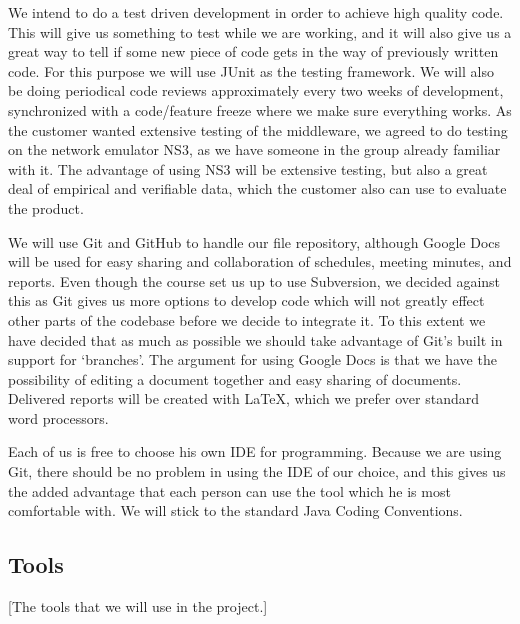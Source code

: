\documentclass[12pt]{article}
\begin{document}
    We  intend to do a test driven development in order to achieve high quality code. This will give us something to test while we are working, and it will also give us a great way to tell if some new piece of code gets in the way of previously written code. For this purpose we will use JUnit as the testing framework. We will also be doing periodical code reviews approximately every two weeks of development, synchronized with a code/feature freeze where we make sure everything works. As the customer wanted extensive testing of the middleware, we agreed to do testing on the network emulator NS3, as we have someone in the group already familiar with it. The advantage of using NS3 will be extensive testing, but also a great deal of empirical and verifiable data, which the customer also can use to evaluate the product.

    We will use Git and GitHub to handle our file repository, although Google Docs will be used for easy sharing and collaboration of schedules, meeting minutes, and reports. Even though the course set us up to use Subversion, we decided against this as Git gives us more options to develop code which will not greatly effect other parts of the codebase before we decide to integrate it. To this extent we have decided that as much as possible we should take advantage of Git’s built in support for ‘branches’. The argument for using Google Docs is that we have the possibility of editing a document together and easy sharing of documents. Delivered reports will be created with LaTeX, which we prefer over standard word processors.

    Each of us is free to choose his own IDE for programming. Because we are using Git, there should be no problem in using the IDE of our choice, and this gives us the added advantage that each person can use the tool which he is most comfortable with. We will stick to the standard Java Coding Conventions.

    \subsection{Tools}\label{tools} [The tools that we will use in the project.]
    
\end{document}
